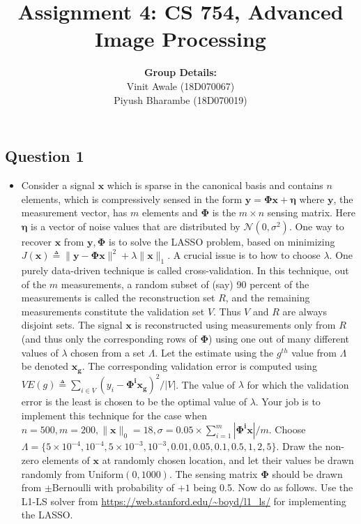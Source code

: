 \documentclass[12pt]{article}
\title{Assignment 4: CS 754, Advanced Image Processing}
\author{\textbf{Group Details:} \\
Vinit Awale (18D070067)\\ 
Piyush Bharambe (18D070019)
}
\date{}
\begin{document}
\maketitle
\begin{center}
    \section*{Question 1}
\end{center}

\begin{itemize}
    \item Consider a signal $\boldsymbol{x}$ which is sparse in the canonical basis and contains $n$ elements, which is compressively sensed in the form $\boldsymbol{y} = \boldsymbol{\Phi x} + \boldsymbol{\eta}$ where $\boldsymbol{y}$, the measurement vector, has $m$ elements and $\boldsymbol{\Phi}$ is the $m \times n$ sensing matrix. Here $\boldsymbol{\eta}$ is a vector of noise values that are distributed by $\mathcal{N}(0,\sigma^2)$.  One way to recover $\boldsymbol{x}$ from $\boldsymbol{y}, \boldsymbol{\Phi}$ is to solve the LASSO problem, based on minimizing $J(\boldsymbol{x}) \triangleq \|\boldsymbol{y}-\boldsymbol{\Phi x}\|^2 + \lambda \|\boldsymbol{x}\|_1$. A crucial issue is to how to choose $\lambda$. One purely data-driven technique is called cross-validation. In this technique, out of the $m$ measurements, a random subset of (say) 90 percent of the measurements is called the reconstruction set $R$, and the remaining measurements constitute the validation set $V$. Thus $V$ and $R$ are always disjoint sets. The signal $\boldsymbol{x}$ is reconstructed using measurements only from $R$ (and thus only the corresponding rows of $\boldsymbol{\Phi}$) using one out of many different values of $\lambda$ chosen from a set $\Lambda$. Let the estimate using the $g^{th}$ value from $\Lambda$ be denoted $\boldsymbol{x_g}$. The corresponding validation error is computed using $VE(g) \triangleq \sum_{i \in V} (y_i - \boldsymbol{\Phi^i x_g})^2/|V|$. The value of $\lambda$ for which the validation error is the least is chosen to be the optimal value of $\lambda$. Your job is to implement this technique for the case when $n = 500, m = 200, \|\boldsymbol{x}\|_0 = 18, \sigma = 0.05 \times \sum_{i=1}^m |\boldsymbol{\Phi^i x}| / m$. Choose $\Lambda = \{5 \times 10^{-4}, 10^{-4}, 5 \times 10^{-3}, 10^{-3}, 0.01, 0.05, 0.1, 0.5, 1, 2, 5\}$. Draw the non-zero elements of $\boldsymbol{x}$ at randomly chosen location, and let their values be drawn randomly from $\textrm{Uniform}(0,1000)$. The sensing matrix $\boldsymbol{\Phi}$ should be drawn from $\pm \textrm{Bernoulli}$ with probability of $+1$ being 0.5. Now do as follows. Use the L1-LS solver from \url{https://web.stanford.edu/~boyd/l1_ls/}  for implementing the LASSO. 


\end{itemize}
\end{document}
